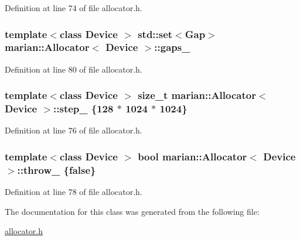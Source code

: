 Definition at line 74 of file allocator.\+h.

\subsubsection[{\texorpdfstring{gaps\+\_\+}{gaps_}}]{\setlength{\rightskip}{0pt plus 5cm}template$<$class Device $>$ {\bf std\+::set}$<${\bf Gap}$>$ {\bf marian\+::\+Allocator}$<$ Device $>$\+::gaps\+\_\+\hspace{0.3cm}{\ttfamily [private]}}\hypertarget{classmarian_1_1Allocator_a460784b3875b3cfa400c7737a6f6a1f0}{}\label{classmarian_1_1Allocator_a460784b3875b3cfa400c7737a6f6a1f0}


Definition at line 80 of file allocator.\+h.

\subsubsection[{\texorpdfstring{step\+\_\+}{step_}}]{\setlength{\rightskip}{0pt plus 5cm}template$<$class Device $>$ size\+\_\+t {\bf marian\+::\+Allocator}$<$ Device $>$\+::step\+\_\+ \{128 $\ast$ 1024 $\ast$ 1024\}\hspace{0.3cm}{\ttfamily [private]}}\hypertarget{classmarian_1_1Allocator_a1d2edd412f03ab7d3b72634498424354}{}\label{classmarian_1_1Allocator_a1d2edd412f03ab7d3b72634498424354}


Definition at line 76 of file allocator.\+h.

\subsubsection[{\texorpdfstring{throw\+\_\+}{throw_}}]{\setlength{\rightskip}{0pt plus 5cm}template$<$class Device $>$ bool {\bf marian\+::\+Allocator}$<$ Device $>$\+::throw\+\_\+ \{false\}\hspace{0.3cm}{\ttfamily [private]}}\hypertarget{classmarian_1_1Allocator_afcc8754622b6574b234dc7dba46ccea7}{}\label{classmarian_1_1Allocator_afcc8754622b6574b234dc7dba46ccea7}


Definition at line 78 of file allocator.\+h.



The documentation for this class was generated from the following file\+:\begin{DoxyCompactItemize}
\item 
\hyperlink{allocator_8h}{allocator.\+h}\end{DoxyCompactItemize}
